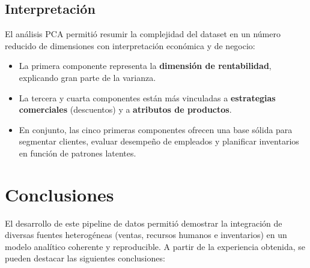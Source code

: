 \documentclass[12pt,a4paper]{article}
\begin{document}
\subsection{Interpretación}
El análisis PCA permitió resumir la complejidad del dataset en un número reducido de 
dimensiones con interpretación económica y de negocio:
\begin{itemize}
    \item La primera componente representa la \textbf{dimensión de rentabilidad}, 
    explicando gran parte de la varianza.
    \item La tercera y cuarta componentes están más vinculadas a \textbf{estrategias 
    comerciales} (descuentos) y a \textbf{atributos de productos}.
    \item En conjunto, las cinco primeras componentes ofrecen una base sólida para 
    segmentar clientes, evaluar desempeño de empleados y planificar inventarios en 
    función de patrones latentes.
\end{itemize}


\section{Conclusiones}

El desarrollo de este pipeline de datos permitió demostrar la integración de diversas 
fuentes heterogéneas (ventas, recursos humanos e inventarios) en un modelo analítico 
coherente y reproducible. A partir de la experiencia obtenida, se pueden destacar 
las siguientes conclusiones:
\end{document}
